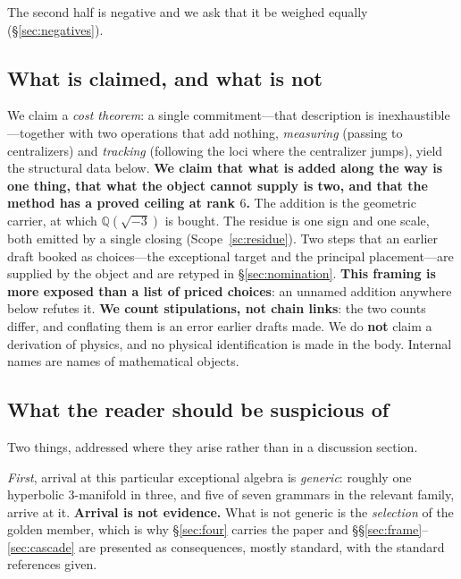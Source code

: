\documentclass[11pt,reqno]{amsart}
\theoremstyle{plain}
\theoremstyle{definition}
\theoremstyle{remark}
\newcommand{\Q}{\mathbb{Q}}
\begin{document}
The second half is negative and we ask that it be weighed equally
(\S\ref{sec:negatives}).

\subsection{What is claimed, and what is not}
We claim a \emph{cost theorem}: a single commitment---that description is
inexhaustible---together with two operations
that add nothing, \emph{measuring} (passing to centralizers) and \emph{tracking}
(following the loci where the centralizer jumps), yield the structural data below.
\textbf{We claim that what is added along the way is one thing, that what the object
cannot supply is two, and that the method has a proved ceiling at rank $6$.} The addition is the geometric carrier, at which
$\Q(\sqrt{-3})$ is bought. The residue is one sign and one
scale, both emitted by a single closing (Scope~\ref{sc:residue}). Two steps that an earlier draft booked as choices---the
exceptional target and the principal placement---are supplied by the object and are
retyped in \S\ref{sec:nomination}. \textbf{This framing is more exposed than a list of
priced choices}: an unnamed addition anywhere below refutes it.
\textbf{We count stipulations, not chain links}: the two counts differ, and conflating
them is an error earlier drafts made. We do \textbf{not} claim a derivation of physics, and no physical identification
is made in the body. Internal names are names of mathematical objects.

\subsection{What the reader should be suspicious of}\label{sec:suspicious}
Two things, addressed where they arise rather than in a discussion section.

\emph{First}, arrival at this particular exceptional algebra is \emph{generic}: roughly
one hyperbolic $3$-manifold in three, and five of seven grammars in the relevant
family, arrive at it. \textbf{Arrival is not evidence.} What is not generic is the
\emph{selection} of the golden member, which is why \S\ref{sec:four} carries the paper
and \S\S\ref{sec:frame}--\ref{sec:cascade} are presented as consequences, mostly
standard, with the standard references given.
\end{document}
